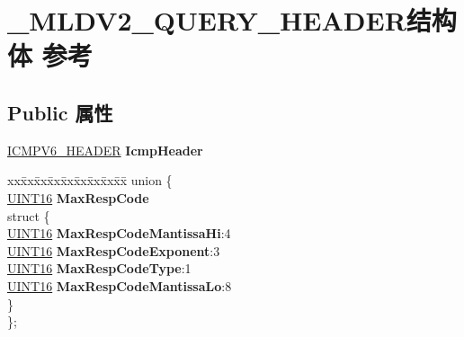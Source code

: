 \hypertarget{struct___m_l_d_v2___q_u_e_r_y___h_e_a_d_e_r}{}\section{\+\_\+\+M\+L\+D\+V2\+\_\+\+Q\+U\+E\+R\+Y\+\_\+\+H\+E\+A\+D\+E\+R结构体 参考}
\label{struct___m_l_d_v2___q_u_e_r_y___h_e_a_d_e_r}
\subsection*{Public 属性}
\begin{DoxyCompactItemize}
\item 
\mbox{\label{struct___m_l_d_v2___q_u_e_r_y___h_e_a_d_e_r_ab6551df638337a0932e5f7e20d7b96d0}} 
\hyperlink{struct_i_c_m_p___h_e_a_d_e_r}{I\+C\+M\+P\+V6\+\_\+\+H\+E\+A\+D\+ER} {\bfseries Icmp\+Header}
\item 
\mbox{\label{struct___m_l_d_v2___q_u_e_r_y___h_e_a_d_e_r_a6bcbeccf7030e12dc312f9da192866d6}} 
\begin{tabbing}
xx\=xx\=xx\=xx\=xx\=xx\=xx\=xx\=xx\=\kill
union \{\\
\>\hyperlink{_processor_bind_8h_a09f1a1fb2293e33483cc8d44aefb1eb1}{UINT16} {\bfseries MaxRespCode}\\
\mbox{\label{union___m_l_d_v2___q_u_e_r_y___h_e_a_d_e_r_1_1_0D2679_a8234178aa425c0d61be67f7e72a85cc8}} 
\>struct \{\\
\>\>\hyperlink{_processor_bind_8h_a09f1a1fb2293e33483cc8d44aefb1eb1}{UINT16} {\bfseries MaxRespCodeMantissaHi}:4\\
\>\>\hyperlink{_processor_bind_8h_a09f1a1fb2293e33483cc8d44aefb1eb1}{UINT16} {\bfseries MaxRespCodeExponent}:3\\
\>\>\hyperlink{_processor_bind_8h_a09f1a1fb2293e33483cc8d44aefb1eb1}{UINT16} {\bfseries MaxRespCodeType}:1\\
\>\>\hyperlink{_processor_bind_8h_a09f1a1fb2293e33483cc8d44aefb1eb1}{UINT16} {\bfseries MaxRespCodeMantissaLo}:8\\
\>\} \\
\}; \\


\end{tabbing}
\end{DoxyCompactItemize}

